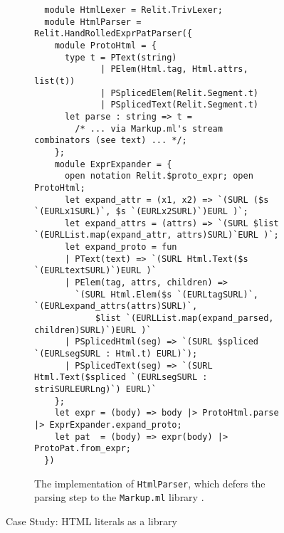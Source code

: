 \documentclass[acmsmall]{acmart}
\newcommand{\li}[1]{\lstinline[basicstyle=\ttfamily\fontsize{9pt}{1em}\selectfont]{#1}}
\begin{document}
\begin{figure}[t]
\begin{subfigure}[t]{\textwidth}
\vspace{3px}
\begin{lstlisting}
  module HtmlLexer = Relit.TrivLexer;
  module HtmlParser = Relit.HandRolledExprPatParser({
    module ProtoHtml = {
      type t = PText(string)
             | PElem(Html.tag, Html.attrs, list(t))
             | PSplicedElem(Relit.Segment.t) 
             | PSplicedText(Relit.Segment.t) 
      let parse : string => t = 
        /* ... via Markup.ml's stream combinators (see text) ... */;
    };
    module ExprExpander = {
      open notation Relit.$proto_expr; open ProtoHtml;
      let expand_attr = (x1, x2) => `(SURL ($s `(EURLx1SURL)`, $s `(EURLx2SURL)`)EURL )`;
      let expand_attrs = (attrs) => `(SURL $list `(EURLList.map(expand_attr, attrs)SURL)`EURL )`;
      let expand_proto = fun 
      | PText(text) => `(SURL Html.Text($s `(EURLtextSURL)`)EURL )` 
      | PElem(tag, attrs, children) => 
        `(SURL Html.Elem($s `(EURLtagSURL)`, `(EURLexpand_attrs(attrs)SURL)`, 
            $list `(EURLList.map(expand_parsed, children)SURL)`)EURL )`
      | PSplicedHtml(seg) => `(SURL $spliced `(EURLsegSURL : Html.t) EURL)`);
      | PSplicedText(seg) => `(SURL Html.Text($spliced `(EURLsegSURL : striSURLEURLng)`) EURL)`
    };
    let expr = (body) => body |> ProtoHtml.parse |> ExprExpander.expand_proto;
    let pat  = (body) => expr(body) |> ProtoPat.from_expr;
  })
\end{lstlisting}
\vspace{-6px}
\caption{The implementation of \li{HtmlParser}, which defers the parsing step to the \li{Markup.ml} library \cite{markupml}.}
\label{fig:html-parser}
\vspace{-5px}
\end{subfigure}
\vspace{5px}
\caption{Case Study: HTML literals as a library}
\vspace{-4px}
\label{fig:html-case-study}
\end{figure}
\end{document}
